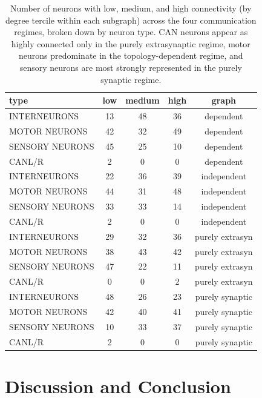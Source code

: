 \documentclass[prx,superscriptaddres, twocolumn]{revtex4-2}
\begin{document}
\begin{table}[H]
\caption{Number of neurons with low, medium, and high connectivity (by degree tercile
within each subgraph) across the four communication regimes, broken down by neuron type.
CAN neurons appear as highly connected only in the purely extrasynaptic regime, motor
neurons predominate in the topology-dependent regime, and sensory neurons are most
strongly represented in the purely synaptic regime.}
\medskip
\label{tab:connectivity_rank}
\begin{ruledtabular}
\begin{tabular}{lcccc}
\textbf{type} & \textbf{low} & \textbf{medium} & \textbf{high} & \textbf{graph} \\
\hline
INTERNEURONS    & 13 & 48 & 36 & dependent \\
MOTOR NEURONS   & 42 & 32 & 49 & dependent \\
SENSORY NEURONS & 45 & 25 & 10 & dependent \\
CANL/R          &  2 &  0 &  0 & dependent \\
INTERNEURONS    & 22 & 36 & 39 & independent \\
MOTOR NEURONS   & 44 & 31 & 48 & independent \\
SENSORY NEURONS & 33 & 33 & 14 & independent \\
CANL/R          &  2 &  0 &  0 & independent \\
INTERNEURONS    & 29 & 32 & 36 & purely extrasyn \\
MOTOR NEURONS   & 38 & 43 & 42 & purely extrasyn \\
SENSORY NEURONS & 47 & 22 & 11 & purely extrasyn \\
CANL/R          &  0 &  0 &  2 & purely extrasyn \\
INTERNEURONS    & 48 & 26 & 23 & purely synaptic \\
MOTOR NEURONS   & 42 & 40 & 41 & purely synaptic \\
SENSORY NEURONS & 10 & 33 & 37 & purely synaptic \\
CANL/R          &  2 &  0 &  0 & purely synaptic \\
\end{tabular}
\end{ruledtabular}
\end{table}


\section{\label{sec:discussion}Discussion and Conclusion}
\end{document}
